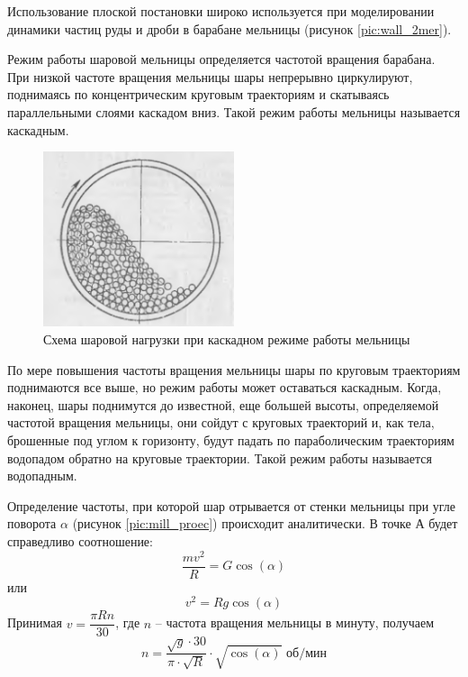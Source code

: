 \documentclass[utf8x, 14pt, oneside, a4paper]{article}
\begin{document}
Использование плоской постановки широко используется при моделировании динамики частиц руды и дроби в барабане мельницы (рисунок \ref{pic:wall_2mer}).

Режим работы шаровой мельницы определяется частотой вращения барабана.
При низкой частоте вращения мельницы шары непрерывно циркулируют, поднимаясь по концентрическим круговым траекториям и скатываясь параллельными слоями каскадом вниз.
Такой режим работы мельницы называется каскадным.

\begin{figure}[H]
	\centering
	\includegraphics[width=0.5\textwidth]{kaskad_theory} 
	\caption{Схема шаровой нагрузки при каскадном режиме работы мельницы}
	\label{pic:kaskad_theory}
\end{figure} 

По мере повышения частоты вращения мельницы шары по круговым траекториям поднимаются все выше, но режим работы может оставаться каскадным.
Когда, наконец, шары поднимутся до известной, еще большей высоты, определяемой частотой вращения мельницы, они сойдут с круговых траекторий и, как тела, брошенные под углом к горизонту, будут падать по параболическим траекториям водопадом обратно на круговые траектории.
Такой режим работы называется водопадным.

Определение частоты, при которой шар отрывается от стенки мельницы при угле поворота $\alpha$ (рисунок \ref{pic:mill_proec}) происходит аналитически.
В точке А будет справедливо соотношение:
\[
\frac{mv^2}{R} = G \cos (\alpha)
\]
или 
\[
v^2 = Rg \cos (\alpha)
\]
Принимая $v = \dfrac{\pi R n}{30}$, где $n$ -- частота вращения мельницы в минуту, получаем
\begin{equation}
n = \frac{\sqrt{g} \cdot 30}{\pi \cdot \sqrt{R}} \cdot \sqrt{\cos (\alpha)} \text{ об/мин}
\end{equation}
\end{document}
